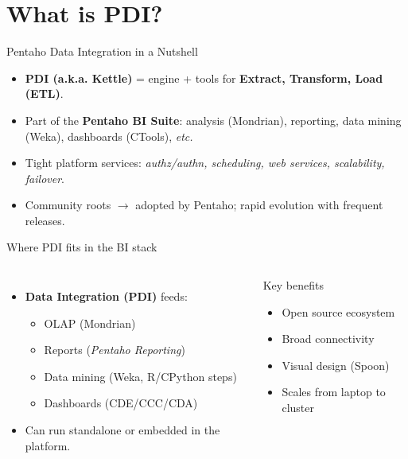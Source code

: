 \documentclass[aspectratio=169]{beamer}
\begin{document}
\section{What is PDI?}

\begin{frame}{Pentaho Data Integration in a Nutshell}
    \begin{itemize}
    \item \textbf{PDI (a.k.a. Kettle)} = engine + tools for \textbf{Extract, Transform, Load (ETL)}.
    \item Part of the \textbf{Pentaho BI Suite}: analysis (Mondrian), reporting, data mining (Weka), dashboards (CTools), \textit{etc.}
    \item Tight platform services: \textit{authz/authn, scheduling, web services, scalability, failover}.
    \item Community roots \(\rightarrow\) adopted by Pentaho; rapid evolution with frequent releases.
    \end{itemize}
\end{frame}

\begin{frame}{Where PDI fits in the BI stack}
    \begin{columns}[T,onlytextwidth]
            \begin{itemize}
                \item \textbf{Data Integration (PDI)} feeds:
                \begin{itemize}
                    \item OLAP (Mondrian)
                    \item Reports (\emph{Pentaho Reporting})
                    \item Data mining (Weka, R/CPython steps)
                    \item Dashboards (CDE/CCC/CDA)
                \end{itemize}
                \item Can run standalone or embedded in the platform.
            \end{itemize}
            \begin{block}{Key benefits}
                \begin{itemize}
                    \item Open source ecosystem
                    \item Broad connectivity
                    \item Visual design (Spoon)
                    \item Scales from laptop to cluster
                \end{itemize}
            \end{block}
    \end{columns}
\end{frame}
\end{document}
